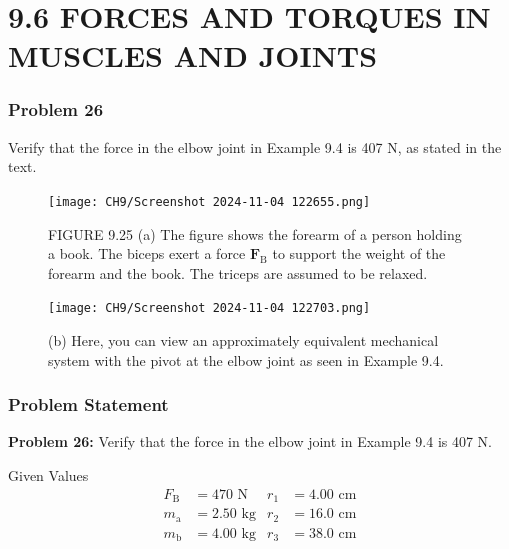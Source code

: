 \documentclass{beamer}
\begin{document}
\section{9.6 FORCES AND TORQUES IN MUSCLES AND JOINTS}

\begin{frame}
\frametitle{Problem 26}
Verify that the force in the elbow joint in Example 9.4 is 407 N, as stated in the text.
\begin{figure}
    \centering
    \texttt{[image: CH9/Screenshot 2024-11-04 122655.png]}
    \caption{FIGURE 9.25 (a) The figure shows the forearm of a person holding a book. The biceps exert a force $\mathbf{F}_{\mathrm{B}}$ to support the weight of the forearm and the book. The triceps are assumed to be relaxed.}
\end{figure}
\end{frame}

\begin{frame}
\begin{figure}
    \centering
    \texttt{[image: CH9/Screenshot 2024-11-04 122703.png]}
    \caption{ (b) Here, you can view an approximately equivalent mechanical system with the pivot at the elbow joint as seen in Example 9.4.}
\end{figure}
\end{frame}

\begin{frame}
\frametitle{Problem Statement}
\textbf{Problem 26:} Verify that the force in the elbow joint in Example 9.4 is 407 N.

\begin{block}{Given Values}
\begin{align*}
F_{\text{B}} &= 470 \text{ N} & r_1 &= 4.00 \text{ cm} \\
m_{\text{a}} &= 2.50 \text{ kg} & r_2 &= 16.0 \text{ cm} \\
m_{\text{b}} &= 4.00 \text{ kg} & r_3 &= 38.0 \text{ cm}
\end{align*}
\end{block}
\end{frame}
\end{document}

